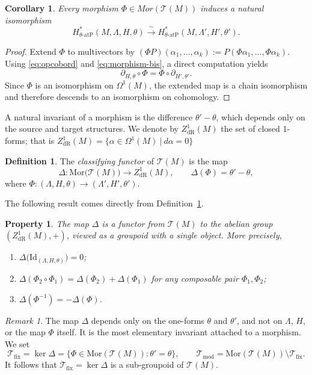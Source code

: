 \documentclass[11pt,a4paper]{article}
\theoremstyle{plain}
\newtheorem{property}[theorem]{Property}
\newtheorem{corollary}[theorem]{Corollary}
\theoremstyle{definition}
\newtheorem{definition}[theorem]{Definition}
\theoremstyle{remark}
\newtheorem{remark}[theorem]{Remark}
\begin{document}
\begin{corollary}\label{cor:cohom}
Every morphism $\Phi \in Mor(\mathcal{T}(M))$ induces a natural isomorphism
$$
   H^{*}_{\theta\text{-atP}}(M,\Lambda,H,\theta)
  \xrightarrow{\;\sim\;}
   H^{*}_{\theta\text{-atP}}(M,\Lambda',H',\theta').
$$
\end{corollary}

\begin{proof}
Extend $\Phi$ to multivectors by
$(\Phi P)(\alpha_1,\ldots,\alpha_k) := P(\Phi\alpha_1,\ldots,\Phi\alpha_k)$.
Using \eqref{eq:opcobord} and \eqref{eq:morphism-bis},
a direct computation yields
$$
\partial_{H,\theta}\circ\Phi = \Phi\circ\partial_{H',\theta'}.
$$
Since $\Phi$ is an isomorphism on $\Omega^1(M)$, the extended map is a chain
isomorphism and therefore descends to an isomorphism on cohomology.
\end{proof}
 A natural invariant of a morphism is the difference $\theta'-\theta$, which depends only on the source and target structures.  We denote by $Z^1_{\mathrm{dR}}(M)$ the set of closed  1-forms; that is
 $Z^1_{\mathrm{dR}}(M)=\{ \alpha\in\Omega^1(M) \ |\  d\alpha=0\} $

\begin{definition}\label{def:Delta}
	The \emph{classifying functor} of $\mathcal{T}(M)$ is the map
	$$
	\Delta :  \mathrm{Mor}\bigl(\mathcal{T}(M)\bigr)
	\longrightarrow Z^1_{\mathrm{dR}}(M), \qquad
	\Delta(\Phi) = \theta' - \theta,
	$$
	where $\Phi : (\Lambda, H, \theta) \to (\Lambda', H', \theta')$.
\end{definition}

The following result comes directly from Definition~\ref{def:Delta}.
\begin{property}\label{prop:Delta-functeur}
	The map $\Delta$ is a functor from $\mathcal{T}(M)$ to the abelian group
	$(Z^1_{\mathrm{dR}}(M), +)$, viewed as a groupoid with a single object.
	More precisely,
	\begin{enumerate}
		\item[(i)] $\Delta\bigl(\mathrm{Id}_{(\Lambda,H,\theta)}\bigr) = 0$;
		\item[(ii)] $\Delta(\Phi_2 \circ \Phi_1) = \Delta(\Phi_2) + \Delta(\Phi_1)$
	for any composable pair $\Phi_1,\Phi_2$;
		\item[(iii)] $\Delta(\Phi^{-1}) = -\Delta(\Phi)$.
	\end{enumerate}
\end{property}

\begin{remark}
	The map $\Delta$ depends only on the one-forms $\theta$ and $\theta'$,
	and not on $\Lambda$, $H$, or the map $\Phi$ itself. It is
	the most elementary invariant attached to a morphism.
	We set
	$$
	\mathcal{T}_{\mathrm{fix}} = \ker\Delta
	= \bigl\{\Phi \in \mathrm{Mor}(\mathcal{T}(M)) : \theta' = \theta\bigr\},
	\qquad
	\mathcal{T}_{\mathrm{mod}} = \mathrm{Mor}(\mathcal{T}(M)) \setminus \mathcal{T}_{\mathrm{fix}}.
	$$
	It follows that $\mathcal{T}_{\mathrm{fix}}=\ker\Delta$ is a sub-groupoid of
	$\mathcal{T}(M)$.
\end{remark}
\end{document}
